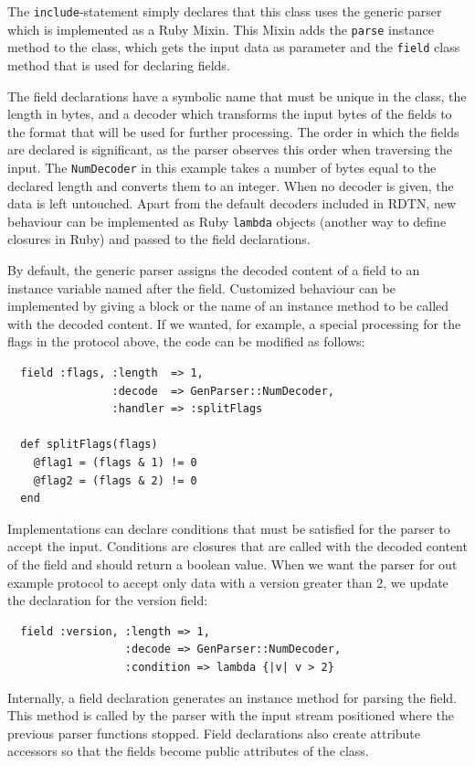 \documentclass[a4paper]{article}
\begin{document}
The {\tt include}-statement simply declares that this class uses the generic
parser which is implemented as a Ruby Mixin. This Mixin adds the {\tt parse}
instance method to the class, which gets the input data as parameter and
the {\tt field} class method that is used for declaring fields.

 The field declarations have a symbolic name that must be unique in the class,
the length in bytes, and a decoder which transforms the input bytes of the
fields to the format that will be used for further processing.  The order in
which the fields are declared is significant, as the parser observes this order
when traversing the input.  The {\tt NumDecoder} in this example takes a number
of bytes equal to the declared length and converts them to an integer. When no
decoder is given, the data is left untouched. Apart from the default decoders
included in RDTN, new behaviour can be implemented as Ruby {\tt lambda} objects
(another way to define closures in Ruby) and passed to the field declarations.

By default, the generic parser assigns the decoded content of a field to an
instance variable named after the field. Customized behaviour can be implemented
by giving a block or the name of an instance method to be called with the
decoded content. If we wanted, for example, a special processing for the flags
in the protocol above, the code can be modified as follows:

\begin{verbatim}
  field :flags, :length  => 1,
                :decode  => GenParser::NumDecoder,
                :handler => :splitFlags
  
  def splitFlags(flags)
    @flag1 = (flags & 1) != 0
    @flag2 = (flags & 2) != 0
  end
\end{verbatim}

Implementations can declare conditions that must be satisfied for the parser to
accept the input. Conditions are closures that are called with the decoded
content of the field and should return a boolean value.  When we want the parser
for out example protocol to accept only data with a version greater than 2, we
update the declaration for the version field:

\begin{verbatim}
  field :version, :length => 1,
                  :decode => GenParser::NumDecoder,
                  :condition => lambda {|v| v > 2}
\end{verbatim}

Internally, a field declaration generates an instance method for parsing the
field. This method is called by the parser with the input stream positioned
where the previous parser functions stopped. Field declarations also create
attribute accessors so that the fields become public attributes of the class.
\end{document}
